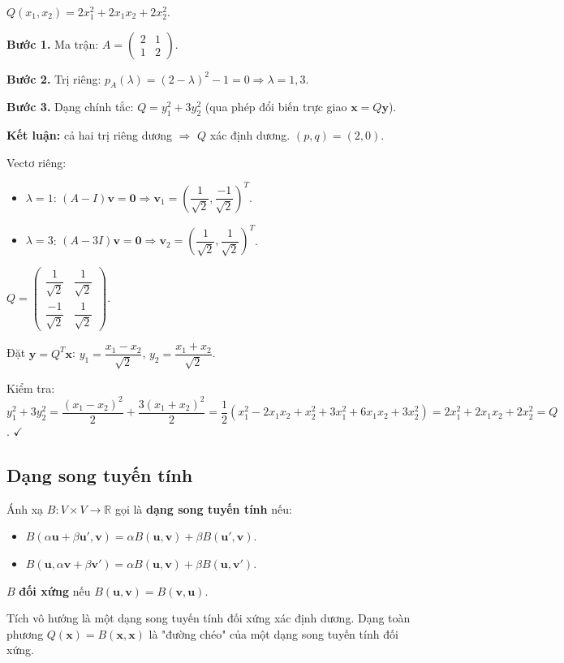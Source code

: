 \documentclass[12pt,a4paper]{article}
\begin{document}
\begin{vidu}[title={Đưa về dạng chính tắc}]
$Q(x_1, x_2) = 2x_1^2 + 2x_1 x_2 + 2x_2^2$.

\textbf{Bước 1.} Ma trận: $A = \begin{pmatrix}2 & 1\\ 1 & 2\end{pmatrix}$.

\textbf{Bước 2.} Trị riêng: $p_A(\lambda) = (2-\lambda)^2 - 1 = 0 \Rightarrow \lambda = 1, 3$.

\textbf{Bước 3.} Dạng chính tắc: $Q = y_1^2 + 3 y_2^2$ (qua phép đổi biến trực giao $\mathbf{x} = Q\mathbf{y}$).

\textbf{Kết luận:} cả hai trị riêng dương $\Rightarrow$ $Q$ xác định dương. $(p, q) = (2, 0)$.

Vectơ riêng:
\begin{itemize}
  \item $\lambda = 1$: $(A - I)\mathbf{v} = \mathbf{0} \Rightarrow \mathbf{v}_1 = (\dfrac{1}{\sqrt{2}}, \dfrac{-1}{\sqrt{2}})^T$.
  \item $\lambda = 3$: $(A - 3I)\mathbf{v} = \mathbf{0} \Rightarrow \mathbf{v}_2 = (\dfrac{1}{\sqrt{2}}, \dfrac{1}{\sqrt{2}})^T$.
\end{itemize}
$Q = \begin{pmatrix}\dfrac{1}{\sqrt{2}} & \dfrac{1}{\sqrt{2}}\\ \dfrac{-1}{\sqrt{2}} & \dfrac{1}{\sqrt{2}}\end{pmatrix}$.

Đặt $\mathbf{y} = Q^T \mathbf{x}$: $y_1 = \dfrac{x_1 - x_2}{\sqrt{2}}$, $y_2 = \dfrac{x_1 + x_2}{\sqrt{2}}$.

Kiểm tra: $y_1^2 + 3 y_2^2 = \dfrac{(x_1 - x_2)^2}{2} + \dfrac{3(x_1 + x_2)^2}{2} = \dfrac{1}{2}(x_1^2 - 2x_1 x_2 + x_2^2 + 3 x_1^2 + 6 x_1 x_2 + 3 x_2^2) = 2x_1^2 + 2 x_1 x_2 + 2x_2^2 = Q$. $\checkmark$
\end{vidu}

\subsection{Dạng song tuyến tính}

\begin{dinhnghia}
  Ánh xạ $B: V \times V \to \mathbb{R}$ gọi là \textbf{dạng song tuyến tính} nếu:
  \begin{itemize}
    \item $B(\alpha \mathbf{u} + \beta \mathbf{u}', \mathbf{v}) = \alpha B(\mathbf{u}, \mathbf{v}) + \beta B(\mathbf{u}', \mathbf{v})$.
    \item $B(\mathbf{u}, \alpha \mathbf{v} + \beta \mathbf{v}') = \alpha B(\mathbf{u}, \mathbf{v}) + \beta B(\mathbf{u}, \mathbf{v}')$.
  \end{itemize}
  $B$ \textbf{đối xứng} nếu $B(\mathbf{u}, \mathbf{v}) = B(\mathbf{v}, \mathbf{u})$.

  Tích vô hướng là một dạng song tuyến tính đối xứng xác định dương. Dạng toàn phương $Q(\mathbf{x}) = B(\mathbf{x}, \mathbf{x})$ là "đường chéo" của một dạng song tuyến tính đối xứng.
\end{dinhnghia}
\end{document}
